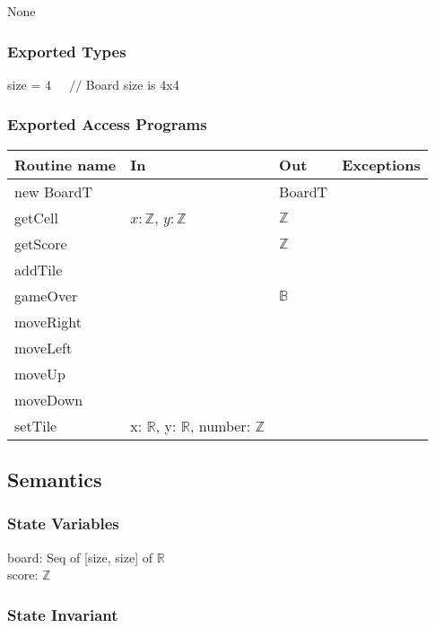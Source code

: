 \documentclass[12pt]{article}
\begin{document}
None

\subsubsection* {Exported Types}

size = 4    $\ \ \ \ \  //$ Board size is 4x4 

\subsubsection* {Exported Access Programs}

\begin{tabular}{| l | l | l | p{5cm} |}
\hline
\textbf{Routine name} & \textbf{In} & \textbf{Out} & \textbf{Exceptions}\\
\hline
new BoardT & ~  & BoardT & ~ \\

\hline
getCell & $x : \mathbb{Z} $, $y : \mathbb{Z} $ & $\mathbb{Z} $ & ~\\ 
\hline
getScore & & $\mathbb{Z} $ & ~\\ 
\hline
addTile & & & ~\\ 
\hline
gameOver & & $\mathbb{B}$ & ~\\
\hline
moveRight & & & ~\\
\hline
moveLeft & & & ~\\
\hline
moveUp & & & ~\\
\hline
moveDown & & & ~\\
\hline
setTile & x: $\mathbb{R}$, y: $\mathbb{R}$, number: $\mathbb{Z}$ & & ~\\
\hline
\end{tabular}

\subsection* {Semantics}

\subsubsection* {State Variables}

board: Seq of [size, size] of $\mathbb{R}$\\
score: $\mathbb{Z}$\\

\subsubsection* {State Invariant}
\end{document}
